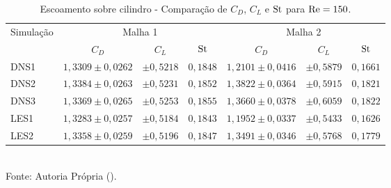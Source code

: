 \begin{table}[h!]
    \centering
    \caption{Escoamento sobre cilindro - Comparação de $C_D$, $C_L$ e $\mathrm{St}$ para $\mathrm{Re}=150$.}
    \begin{tabular}{lcccccc}
        \hline
        \multirow{2}{*}{Simulação} & \multicolumn{3}{c}{Malha 1} & \multicolumn{3}{c}{Malha 2}                                                         \\\cline{2-7}
                                   & $C_D$                       & $C_L$                       & $\mathrm{St}$   & $C_D$             & $C_L$       & $\mathrm{St}$   \\\hline
        DNS1                       & $1,3309\pm0,0262$           & $\pm0,5218$                 & $0,1848$ & $1,2101\pm0,0416$ & $\pm0,5879$ & $0,1661$ \\
        DNS2                       & $1,3384\pm0,0263$           & $\pm0,5231$                 & $0,1852$ & $1,3822\pm0,0364$ & $\pm0,5915$ & $0,1821$ \\
        DNS3                       & $1,3369\pm0,0265$           & $\pm0,5253$                 & $0,1855$ & $1,3660\pm0,0378$ & $\pm0,6059$ & $0,1822$ \\
        LES1                       & $1,3283\pm0,0257$           & $\pm0,5184$                 & $0,1843$ & $1,1952\pm0,0337$ & $\pm0,5433$ & $0,1626$ \\
        LES2                       & $1,3358\pm0,0259$           & $\pm0,5196$                 & $0,1847$ & $1,3491\pm0,0346$ & $\pm0,5768$ & $0,1779$ \\\hline
    \end{tabular}
    \\Fonte: Autoria Própria (\the\year).
    \label{tab:cyl-comp150}
\end{table}

